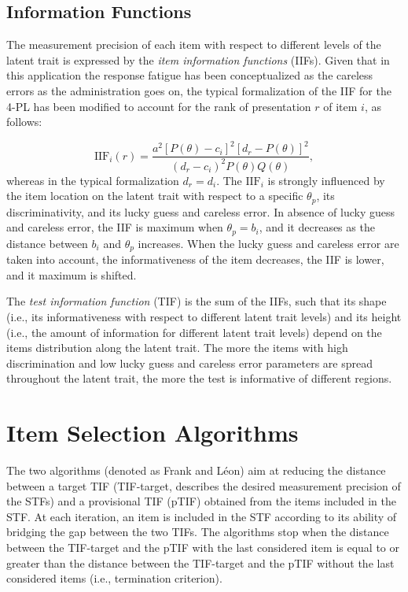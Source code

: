 \documentclass{svproc}
\begin{document}
\subsection{Information Functions}

The measurement precision of each item with respect to different levels of the latent trait is expressed by the \emph{item information functions} (IIFs). 
\color{blue}
Given that in this application the response fatigue has been conceptualized as the careless errors as the administration goes on, the typical formalization of the IIF for the 4-PL \cite{magis:iif} has been modified to account for the rank of presentation $r$ of item $i$, as follows:
\normalcolor


\begin{equation}\label{eq:iif}
	\text{IIF}_{i}(r) = \dfrac{a^2[P(\theta)-c_i]^2[d_r - P(\theta)]^2}{(d_{r}-c_i)^2 P(\theta)Q(\theta)}, 
\end{equation}
whereas in the typical formalization $d_r = d_i$.
The $\text{IIF}_i$ is strongly influenced by the item location on the latent trait with respect to a specific $\theta_p$, its discriminativity, and its lucky guess and careless error. In absence of lucky guess and careless error, the IIF is maximum when  $\theta_p = b_i$, and it decreases as the distance between $b_i$ and $\theta_p$ increases. When the lucky guess and careless error are taken into account, the informativeness of the item decreases, the IIF is lower, and it maximum is shifted. 

The \emph{test information function} (TIF) is the sum of the IIFs, such that its shape (i.e., its informativeness with respect to different latent trait levels) and its height (i.e., the amount of information for different latent trait levels) depend on the items distribution along the latent trait. The more the items with high discrimination and low lucky guess and careless error parameters are spread throughout the latent trait, the more the test is informative of different regions. 


\section{Item Selection Algorithms}



The two algorithms (denoted as Frank and Léon) aim at reducing the distance between a target TIF (TIF-target, describes the desired measurement precision of the STFs) and a provisional TIF (pTIF) obtained from the items included in the STF. 
At each iteration, an item is included in the STF according to its ability of bridging the gap between the two TIFs. 
The algorithms stop when the distance between the TIF-target and the pTIF with the last considered item is equal to or greater than the distance between the TIF-target and the pTIF without the last considered items (i.e., termination criterion). 
\end{document}
